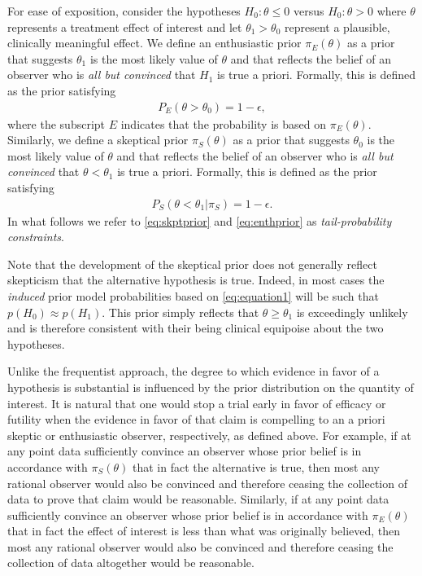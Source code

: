 \documentclass[12pt]{article}
\begin{document}
For ease of exposition, consider the hypotheses $H_0: \theta \le 0$ versus $H_0: \theta > 0$ where $\theta$ represents a treatment effect of interest and let $\theta_1>\theta_0$ 
represent a plausible, clinically meaningful effect.
%
We define an enthusiastic prior $\pi_{E}(\theta)$ as a prior that suggests $\theta_1$ is the most likely value of $\theta$ 
and that reflects the belief of an observer who is \textit{all but convinced} that $H_1$ is true a priori. 
%
Formally, this is defined as the prior satisfying
\begin{align}\label{eq:skptprior}
P_E(\theta >\theta_0)=1-\epsilon,
\end{align}
where the subscript $E$ indicates that the probability is based on $\pi_{E}(\theta)$.
%
Similarly, we define a skeptical prior $\pi_{S}(\theta)$ as a prior that suggests $\theta_0$ is the most likely value of $\theta$ 
and that reflects the belief of an observer who is \textit{all but convinced} that $\theta <\theta_1$ is true a priori. 
%
Formally, this is defined as the prior satisfying
\begin{align}\label{eq:enthprior}
P_S(\theta <\theta_1| \pi_{S})=1-\epsilon.
\end{align}
%
In what follows we refer to \eqref{eq:skptprior} and \eqref{eq:enthprior} as \textit{tail-probability constraints}.

Note that the development of the skeptical prior does not generally reflect skepticism that the alternative hypothesis is true. 
%
Indeed, in most cases the \textit{induced} prior model probabilities based on \eqref{eq:equation1} will be such that $p(H_0) \approx p(H_1)$.
%
This prior simply reflects that $\theta \ge \theta_1$ is exceedingly unlikely and is therefore 
consistent with their being clinical equipoise about the two hypotheses.
%

Unlike the frequentist approach, the degree to which evidence in favor of a hypothesis is substantial is influenced by 
the prior distribution on the quantity of interest.
%
It is natural that one would stop a trial early in favor of efficacy or futility when the evidence in favor of that claim is compelling
to an a priori skeptic or enthusiastic observer, respectively, as defined above.
%
For example, if at any point data sufficiently convince an observer whose prior belief is in accordance with $\pi_{S}(\theta)$ that in fact
the alternative is true, then most any rational observer would also be convinced and therefore ceasing the collection of data
to prove that claim would be reasonable.
%
Similarly, if at any point data sufficiently convince an observer whose prior belief is in accordance with $\pi_{E}(\theta)$ that in fact
the effect of interest is less than what was originally believed, then most any rational observer would also be convinced and therefore ceasing 
the collection of data altogether would be reasonable.
\end{document}
